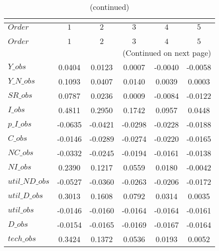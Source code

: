  
\begin{center}
\begin{longtable}{lccccc} 
\caption{COEFFICIENTS OF AUTOCORRELATION}\\
 \label{Table:th_autocorr_matrix}\\
\toprule 
$Order          $	 & 	 $          1$	 & 	 $          2$	 & 	 $          3$	 & 	 $          4$	 & 	 $          5$\\
\midrule \endfirsthead 
\caption{(continued)}\\
 \toprule \\ 
$Order          $	 & 	 $          1$	 & 	 $          2$	 & 	 $          3$	 & 	 $          4$	 & 	 $          5$\\
\midrule \endhead 
\midrule \multicolumn{6}{r}{(Continued on next page)} \\ \bottomrule \endfoot 
\bottomrule \endlastfoot 
$Y\_obs         $	 & 	     0.0404	 & 	     0.0123	 & 	     0.0007	 & 	    -0.0040	 & 	    -0.0058 \\ 
$Y\_N\_obs      $	 & 	     0.1093	 & 	     0.0407	 & 	     0.0140	 & 	     0.0039	 & 	     0.0003 \\ 
$SR\_obs        $	 & 	     0.0787	 & 	     0.0236	 & 	     0.0009	 & 	    -0.0084	 & 	    -0.0122 \\ 
$I\_obs         $	 & 	     0.4811	 & 	     0.2950	 & 	     0.1742	 & 	     0.0957	 & 	     0.0448 \\ 
$p\_I\_obs      $	 & 	    -0.0635	 & 	    -0.0421	 & 	    -0.0298	 & 	    -0.0228	 & 	    -0.0188 \\ 
$C\_obs         $	 & 	    -0.0146	 & 	    -0.0289	 & 	    -0.0274	 & 	    -0.0220	 & 	    -0.0165 \\ 
$NC\_obs        $	 & 	    -0.0332	 & 	    -0.0245	 & 	    -0.0194	 & 	    -0.0161	 & 	    -0.0138 \\ 
$NI\_obs        $	 & 	     0.2390	 & 	     0.1217	 & 	     0.0559	 & 	     0.0180	 & 	    -0.0042 \\ 
$util\_ND\_obs  $	 & 	    -0.0527	 & 	    -0.0360	 & 	    -0.0263	 & 	    -0.0206	 & 	    -0.0172 \\ 
$util\_D\_obs   $	 & 	     0.3013	 & 	     0.1608	 & 	     0.0792	 & 	     0.0314	 & 	     0.0035 \\ 
$util\_obs      $	 & 	    -0.0146	 & 	    -0.0160	 & 	    -0.0164	 & 	    -0.0164	 & 	    -0.0161 \\ 
$D\_obs         $	 & 	    -0.0154	 & 	    -0.0165	 & 	    -0.0169	 & 	    -0.0167	 & 	    -0.0164 \\ 
$tech\_obs      $	 & 	     0.3424	 & 	     0.1372	 & 	     0.0536	 & 	     0.0193	 & 	     0.0052 \\ 
\end{longtable}
 \end{center}
